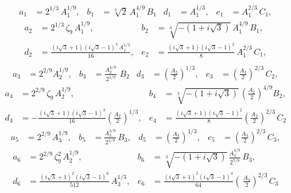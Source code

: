 \documentclass[11pt]{amsart}
\begin{document}
\begin{align*}
	a_1 &  = 2^{1/3} \, A_1^{1/9}, &
	b_1 &=  \sqrt [3]{2}\,  A_1^{4/9} \, B_1&
	d_1 & = A_1^{1/3}, &
	e_1 & = A_1^{2/3}\,  C_1,
\end{align*}
%
\begin{align*}
	a_2 &  =  2^{1/3} \, \zeta_9 \, A_1^{1/9},&
	b_2 &=   \sqrt [3]{-(1+ i \sqrt{3})} \,
	A_1^{4/9}\,  B_1,\\
	d_2 & =\frac{ (i \sqrt{3} +1) (i \sqrt{3} -1)^3 \,  A_1^{1/3}}{16}, &
	e_2&  =\frac{ (i \sqrt{3} +1) (i \sqrt{3} -1)^2 }{8} \,  A_1^{2/3} \, C_1,\\
\end{align*}
%
\begin{align*}
	a_3 &   =2^{2/9} A_2^{1/9}, &
	b_3 &=  \frac{A_2^{4/9}}{2^{1/9}} \, \, B_2 &
	d_3 &=\left( \frac{A_2}{2}\right)^{1/3}, &
	e_3 & =\left( \frac{A_2}{2}\right) ^{2/3} \, C_2,
\end{align*}
%
\begin{align*}
	a_4 &  =  2^{2/9}\,  \zeta_9 \,  A_2^{1/9},&
	b_4 &=\sqrt [3]{-(1+ i \sqrt{3})} \,   \left(\frac{A_2}{2} \right)^{4/9}  B_2, \\
	d_4 & =  -\frac{ (i \sqrt{3} +1) (i \sqrt{3} -1)^3 }{16} \left(  \frac{A_2}{2}\right) ^{1/3},&
	e_4 & =\frac{ (i \sqrt{3} +1) (i \sqrt{3} -1)^2 }{8}  \left( \frac{A_2}{2}\right) ^{2/3} \, C_2
\end{align*}
%
\begin{align*}
	a_5 &  =2^{2/9}\, A_3^{1/9}, & 
	b_5 &=  \frac{A_3^{4/9}}{2^{1/9}}  \,B_3, &
	d_5 &= \left( \frac{A_3}{2}\right)^{1/3},  &
	e_5 &  =\left( \frac{A_3}{2}\right) ^{2/3} \,C_3,
\end{align*}
%
\begin{align*}
	a_6&=  2^{2/9} \, \zeta_9^2  \, A_2^{1/9},&
	b_6 &=    \sqrt [3]{-(1+ i \sqrt{3})} \, \frac{A_3^{4/9}}{2^{7/9}} \, B_3,\\
	d_6 &   =    \frac{\left( i \sqrt{3} +1\right)^2
		\left( i \sqrt{3} -1\right)^6  }{512}\, A_3^{1/3}  ,&
	e_6 & =\frac{ (i \sqrt{3} +1)^2 (i \sqrt{3} -1)^4 }{64} \left( \, \frac{A_3}{2}\right) ^{2/3} \, C_3
\end{align*}

 
\end{document}
